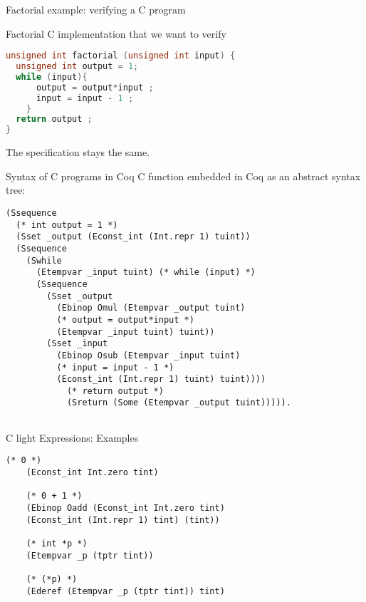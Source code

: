 \documentclass[10pt]{beamer}
\begin{document}
\begin{frame}[fragile]{Factorial example: verifying a C program}

 Factorial C implementation that we want to verify

\begin{lstlisting}[language=C]
unsigned int factorial (unsigned int input) {
  unsigned int output = 1;
  while (input){
      output = output*input ;
      input = input - 1 ;
    } 
  return output ;
}

\end{lstlisting}

The specification stays the same. 

\end{frame}

\begin{frame}[fragile]{ Syntax of C programs in Coq}
C function embedded in Coq as an abstract syntax tree:
  \begin{lstlisting}[language=Coq]
(Ssequence
  (* int output = 1 *)
  (Sset _output (Econst_int (Int.repr 1) tuint)) 
  (Ssequence 
    (Swhile 
      (Etempvar _input tuint) (* while (input) *)
      (Ssequence  
        (Sset _output
          (Ebinop Omul (Etempvar _output tuint) 
          (* output = output*input *)
          (Etempvar _input tuint) tuint)) 
        (Sset _input
          (Ebinop Osub (Etempvar _input tuint) 
          (* input = input - 1 *)
          (Econst_int (Int.repr 1) tuint) tuint))))
            (* return output *)
            (Sreturn (Some (Etempvar _output tuint))))).
          
     \end{lstlisting}
     
\end{frame}



\begin{frame}[fragile]{C light Expressions: Examples}

  \begin{lstlisting}[language=Coq]
    (* 0 *)
    (Econst_int Int.zero tint) 

    (* 0 + 1 *)
    (Ebinop Oadd (Econst_int Int.zero tint)
    (Econst_int (Int.repr 1) tint) (tint))

    (* int *p *)
    (Etempvar _p (tptr tint)) 
    
    (* (*p) *)
    (Ederef (Etempvar _p (tptr tint)) tint)


  \end{lstlisting}
  


\end{frame}
\end{document}
